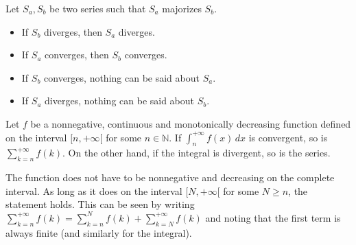 
    \begin{method}
        Let $S_a,S_b$ be two series such that $S_a$ majorizes $S_b$.
        \begin{itemize}
            \item If $S_b$ diverges, then $S_a$ diverges.
            \item If $S_a$ converges, then $S_b$ converges.
            \item If $S_b$ converges, nothing can be said about $S_a$.
            \item If $S_a$ diverges, nothing can be said about $S_b$.
        \end{itemize}
    \end{method}

    \begin{method}
        Let $f$ be a nonnegative, continuous and monotonically decreasing function defined on the interval $[n,+\infty[$ for some $n\in\mathbb{N}$. If $\int_n^{+\infty}f(x)\,dx$ is convergent, so is $\sum_{k=n}^{+\infty}f(k)$. On the other hand, if the integral is divergent, so is the series.
    \end{method}
    \begin{remark}
        The function does not have to be nonnegative and decreasing on the complete interval. As long as it does on the interval $[N,+\infty[$ for some $N\geq n$, the statement holds. This can be seen by writing $\sum_{k=n}^{+\infty}f(k) = \sum_{k=n}^Nf(k) + \sum_{k=N}^{+\infty}f(k)$ and noting that the first term is always finite (and similarly for the integral).
    \end{remark}

